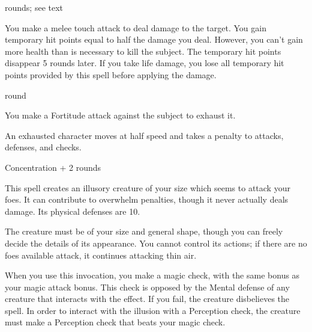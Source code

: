  rounds; see text
\begin{spelleffect}
    You make a melee touch attack to deal damage to the target. You gain temporary hit points equal to half the damage you deal. However, you can't gain more health than is necessary to kill the subject. The temporary hit points disappear 5 rounds later. If you take life damage, you lose all temporary hit points provided by this spell before applying the damage.
\end{spelleffect}

 round
\begin{spelleffect}
    You make a Fortitude attack against the subject to exhaust it.
\end{spelleffect}
\begin{spellnotes}
    An exhausted character moves at half speed and takes a  penalty to attacks, defenses, and checks.
\end{spellnotes}

\spellrng{\rngmed}
\spelldur Concentration + 2 rounds
\begin{spelleffect}
    This spell creates an illusory creature of your size which seems to attack your foes. It can contribute to overwhelm penalties, though it never actually deals damage. Its physical defenses are 10.

    The creature must be of your size and general shape, though you can freely decide the details of its appearance. You cannot control its actions; if there are no foes available attack, it continues attacking thin air.
\end{spelleffect}
\begin{spellnotes}
    When you use this invocation, you make a magic check, with the same bonus as your magic attack bonus. This check is opposed by the Mental defense of any creature that interacts with the effect. If you fail, the creature disbelieves the spell. In order to interact with the illusion with a Perception check, the creature must make a Perception check that beats your magic check.
\end{spellnotes}

